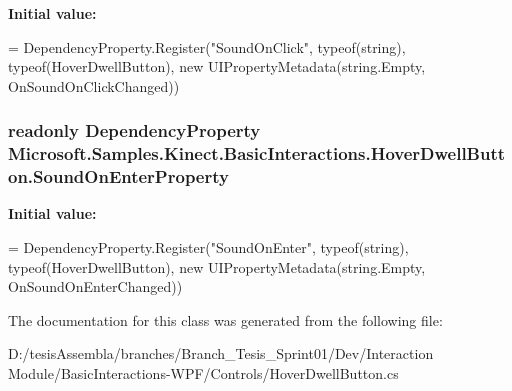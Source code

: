 {\bfseries Initial value\-:}
\begin{DoxyCode}
=
            DependencyProperty.Register(\textcolor{stringliteral}{"SoundOnClick"}, typeof(\textcolor{keywordtype}{string}), typeof(HoverDwellButton), \textcolor{keyword}{new} 
      UIPropertyMetadata(\textcolor{keywordtype}{string}.Empty, OnSoundOnClickChanged))
\end{DoxyCode}
\hypertarget{class_microsoft_1_1_samples_1_1_kinect_1_1_basic_interactions_1_1_hover_dwell_button_a27474d40067e15491314739651cc66ec}{
\subsubsection[{Sound\-On\-Enter\-Property}]{\setlength{\rightskip}{0pt plus 5cm}readonly Dependency\-Property Microsoft.\-Samples.\-Kinect.\-Basic\-Interactions.\-Hover\-Dwell\-Button.\-Sound\-On\-Enter\-Property\hspace{0.3cm}{\ttfamily [static]}}}\label{class_microsoft_1_1_samples_1_1_kinect_1_1_basic_interactions_1_1_hover_dwell_button_a27474d40067e15491314739651cc66ec}
{\bfseries Initial value\-:}
\begin{DoxyCode}
=
            DependencyProperty.Register(\textcolor{stringliteral}{"SoundOnEnter"}, typeof(\textcolor{keywordtype}{string}), typeof(HoverDwellButton), \textcolor{keyword}{new} 
      UIPropertyMetadata(\textcolor{keywordtype}{string}.Empty, OnSoundOnEnterChanged))
\end{DoxyCode}


The documentation for this class was generated from the following file\-:\begin{DoxyCompactItemize}
\item 
D\-:/tesis\-Assembla/branches/\-Branch\-\_\-\-Tesis\-\_\-\-Sprint01/\-Dev/\-Interaction Module/\-Basic\-Interactions-\/\-W\-P\-F/\-Controls/Hover\-Dwell\-Button.\-cs\end{DoxyCompactItemize}
